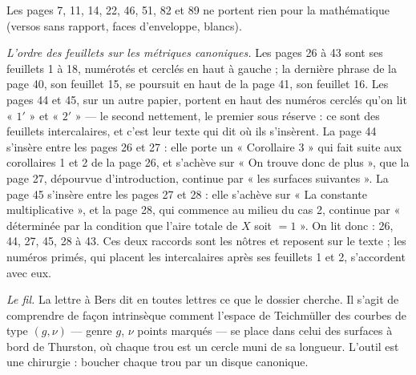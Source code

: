 \documentclass[11pt,a4paper]{article}
\begin{document}
Les pages 7, 11, 14, 22, 46, 51, 82 et 89 ne portent rien pour la
mathématique (versos sans rapport, faces d'enveloppe, blancs).

\emph{L'ordre des feuillets sur les métriques canoniques.} Les pages 26 à 43
sont ses feuillets 1 à 18, numérotés et cerclés en haut à gauche ; la
dernière phrase de la page 40, son feuillet 15, se poursuit en haut de la
page 41, son feuillet 16. Les pages 44 et 45, sur un autre papier, portent en
haut des numéros cerclés qu'on lit « $1'$ » et « $2'$ » --- le second nettement,
le premier sous réserve : ce sont des feuillets intercalaires, et c'est leur
texte qui dit où ils s'insèrent. La page 44 s'insère entre les pages 26 et 27 : elle porte un
« Corollaire 3 » qui fait suite aux corollaires 1 et 2 de la page 26, et
s'achève sur « On trouve donc de plus », que la page 27, dépourvue
d'introduction, continue par « les surfaces suivantes ». La page 45 s'insère
entre les pages 27 et 28 : elle s'achève sur « La constante multiplicative »,
et la page 28, qui commence au milieu du cas 2, continue par « déterminée par
la condition que l'aire totale de $X$ soit $= 1$ ». On lit donc : 26, 44,
27, 45, 28 à 43. Ces deux raccords sont les nôtres et reposent sur le texte ;
les numéros primés, qui placent les intercalaires après ses feuillets 1 et 2,
s'accordent avec eux.

\emph{Le fil.} La lettre à Bers dit en toutes lettres ce que le dossier
cherche. Il s'agit de comprendre de façon intrinsèque comment l'espace de
Teichmüller des courbes de type $(g,\nu)$ --- genre $g$, $\nu$ points marqués
--- se place dans celui des surfaces à bord de Thurston, où chaque trou est un
cercle muni de sa longueur. L'outil est une chirurgie : boucher chaque trou
par un disque canonique.
\end{document}
